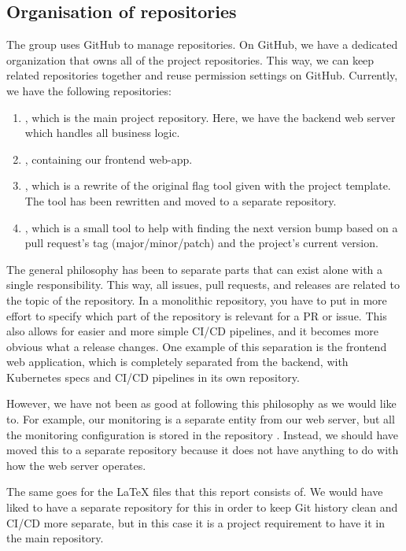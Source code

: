 \subsection{Organisation of repositories}
The group uses GitHub to manage repositories. On GitHub, we have a dedicated organization that owns all of the project repositories. This way, we can keep related repositories together and reuse permission settings on GitHub. Currently, we have the following repositories:
\begin{enumerate}
  \item \href{https://github.com/Devops-2022-Group-R/itu-minitwit}{}, which is the main project repository. Here, we have the backend web server which handles all business logic.
  \item \href{https://github.com/Devops-2022-Group-R/itu-minitwit-frontend}{}, containing our frontend web-app.
  \item \href{https://github.com/Devops-2022-Group-R/flag-tool}{}, which is a rewrite of the original flag tool given with the project template. The tool has been rewritten and moved to a separate repository.
  \item \href{https://github.com/Devops-2022-Group-R/bump-tool}{}, which is a small tool to help with finding the next version bump based on a pull request's tag (major/minor/patch) and the project's current version.
\end{enumerate}
The general philosophy has been to separate parts that can exist alone with a single responsibility. This way, all issues, pull requests, and releases are related to the topic of the repository. In a monolithic repository, you have to put in more effort to specify which part of the repository is relevant for a PR or issue. This also allows for easier and more simple CI/CD pipelines, and it becomes more obvious what a release changes. One example of this separation is the frontend web application, which is completely separated from the backend, with Kubernetes specs and CI/CD pipelines in its own repository.

However, we have not been as good at following this philosophy as we would like to. For example, our monitoring is a separate entity from our web server, but all the monitoring configuration is stored in the  repository \cite{repo:monitoring-config} \cite{repo:monitoring-kubernetes}. Instead, we should have moved this to a separate repository because it does not have anything to do with how the web server operates.

The same goes for the LaTeX files that this report consists of. We would have liked to have a separate repository for this in order to keep Git history clean and CI/CD more separate, but in this case it is a project requirement to have it in the main repository.
